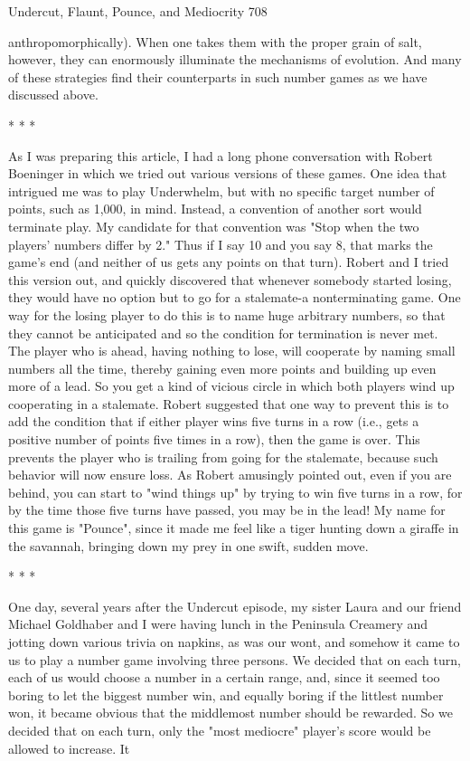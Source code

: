 Undercut, Flaunt, Pounce, and Mediocrity                                             708

anthropomorphically). When one takes them with the proper grain of salt, however,
they can enormously illuminate the mechanisms of evolution. And many of these
strategies find their counterparts in such number games as we have discussed above.

                                       *   *   *

        As I was preparing this article, I had a long phone conversation with Robert
Boeninger in which we tried out various versions of these games. One idea that
intrigued me was to play Underwhelm, but with no specific target number of points,
such as 1,000, in mind. Instead, a convention of another sort would terminate play.
My candidate for that convention was "Stop when the two players' numbers differ by
2." Thus if I say 10 and you say 8, that marks the game's end (and neither of us gets
any points on that turn).
        Robert and I tried this version out, and quickly discovered that whenever
somebody started losing, they would have no option but to go for a stalemate-a
nonterminating game. One way for the losing player to do this is to name huge
arbitrary numbers, so that they cannot be anticipated and so the condition for
termination is never met. The player who is ahead, having nothing to lose, will
cooperate by naming small numbers all the time, thereby gaining even more points
and building up even more of a lead. So you get a kind of vicious circle in which both
players wind up cooperating in a stalemate.
        Robert suggested that one way to prevent this is to add the condition that if
either player wins five turns in a row (i.e., gets a positive number of points five times
in a row), then the game is over. This prevents the player who is trailing from going
for the stalemate, because such behavior will now ensure loss. As Robert amusingly
pointed out, even if you are behind, you can start to "wind things up" by trying to win
five turns in a row, for by the time those five turns have passed, you may be in the
lead! My name for this game is "Pounce", since it made me feel like a tiger hunting
down a giraffe in the savannah, bringing down my prey in one swift, sudden move.

                                       *   *   *

        One day, several years after the Undercut episode, my sister Laura and our
friend Michael Goldhaber and I were having lunch in the Peninsula Creamery and
jotting down various trivia on napkins, as was our wont, and somehow it came to us to
play a number game involving three persons. We decided that on each turn, each of us
would choose a number in a certain range, and, since it seemed too boring to let the
biggest number win, and equally boring if the littlest number won, it became obvious
that the middlemost number should be rewarded. So we decided that on each turn,
only the "most mediocre" player's score would be allowed to increase. It




